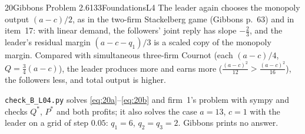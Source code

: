 \begin{exsol}{20}{Gibbons Problem 2.6}{133}{Foundations}{L4}
\interp The leader again chooses the monopoly output $(a-c)/2$, as in the two-firm Stackelberg game
(Gibbons p.~63) and in item~17: with linear demand, the followers' joint reply has slope
$-\frac23$, and the leader's residual margin $(a - c - q_1)/3$ is a scaled copy of the monopoly
margin. Compared with simultaneous three-firm Cournot (each $(a-c)/4$, $Q = \frac34(a-c)$), the
leader produces more and earns more ($\frac{(a-c)^2}{12} > \frac{(a-c)^2}{16}$), the followers less,
and total output is higher.

\verify \texttt{check\_B\_L04.py} solves \eqref{eq:20a}--\eqref{eq:20b} and firm~1's problem with
sympy and checks $Q^*$, $P^*$ and both profits; it also solves the case $a = 13$, $c = 1$ with
the leader on a grid of step $0.05$: $q_1 = 6$, $q_2 = q_3 = 2$. Gibbons prints no answer.

\end{exsol}

